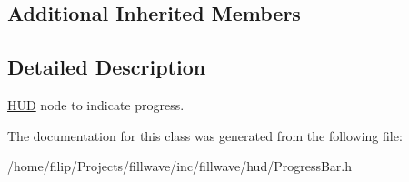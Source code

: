 \subsection*{Additional Inherited Members}


\subsection{Detailed Description}
\hyperlink{classflw_1_1flf_1_1HUD}{H\+UD} node to indicate progress. 

The documentation for this class was generated from the following file\+:\begin{DoxyCompactItemize}
\item 
/home/filip/\+Projects/fillwave/inc/fillwave/hud/Progress\+Bar.\+h\end{DoxyCompactItemize}
